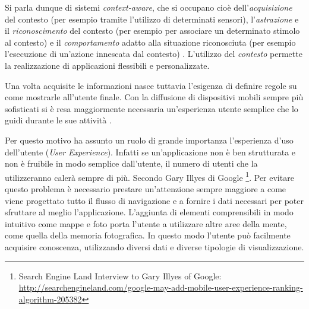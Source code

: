 Si parla dunque di sistemi \emph{context-aware}, che si occupano cioè dell'\emph{acquisizione} del contesto (per esempio tramite l'utilizzo di determinati sensori), l'\emph{astrazione} e il \emph{riconoscimento} del contesto (per esempio per associare un determinato stimolo al contesto) e il \emph{comportamento} adatto alla situazione riconosciuta (per esempio l'esecuzione di un'azione innescata dal contesto) \cite{schmidt2003ubiquitous}. L'utilizzo del \emph{contesto} permette la realizzazione di applicazioni flessibili e personalizzate. 


Una volta acquisite le informazioni nasce tuttavia l'esigenza di definire regole su come mostrarle all'utente finale. Con la diffusione di dispositivi mobili sempre più sofisticati si è resa maggiormente necessaria un'esperienza utente semplice che lo guidi durante le sue attività .


Per questo motivo ha assunto un ruolo di grande importanza l'esperienza d'uso dell'utente (\emph{User Experience}). Infatti se un'applicazione non è ben strutturata e non è fruibile in modo semplice dall'utente, il numero di utenti che la utilizzeranno calerà sempre di più. Secondo Gary Illyes di Google \footnote{Search Engine Land Interview to Gary Illyes of Google: \url{http://searchengineland.com/google-may-add-mobile-user-experience-ranking-algorithm-205382}}. Per evitare questo problema è necessario prestare un'attenzione sempre maggiore a come viene progettato tutto il flusso di navigazione e a fornire i dati necessari per poter sfruttare al meglio l'applicazione. L'aggiunta di elementi comprensibili in modo intuitivo come mappe e foto porta l'utente a utilizzare altre aree della mente, come quella della memoria fotografica. In questo modo l'utente può facilmente acquisire conoscenza, utilizzando diversi dati e diverse tipologie di visualizzazione.


